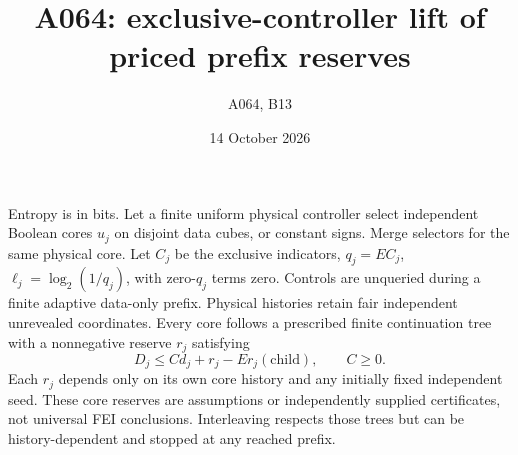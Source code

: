 \documentclass{article}
\begin{document}
\title{A064: exclusive-controller lift of priced prefix reserves}
\author{A064, B13}\date{14 October 2026}\maketitle
Entropy is in bits. Let a finite uniform physical controller select independent
Boolean cores $u_j$ on disjoint data cubes, or constant signs. Merge selectors
for the same physical core. Let $C_j$ be the exclusive indicators, $q_j=EC_j$,
$\ell_j=\log_2(1/q_j)$, with zero-$q_j$ terms zero. Controls are unqueried
during a finite adaptive data-only prefix. Physical histories retain fair
independent unrevealed coordinates. Every core follows a prescribed finite
continuation tree with a nonnegative reserve $r_j$ satisfying
\[
D_j\le C d_j+r_j-E r_j(\text{child}),\qquad C\ge0.
\]
Each $r_j$ depends only on its own core history and any initially fixed independent seed.
These core reserves are assumptions or independently supplied certificates,
not universal FEI conclusions. Interleaving respects those trees but can be
history-dependent and stopped at any reached prefix.
\end{document}
